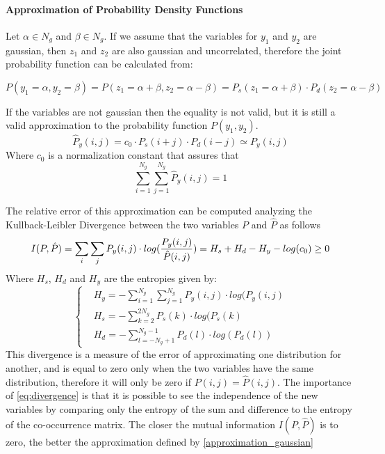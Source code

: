 \paragraph{Approximation of Probability Density Functions}
Let $\alpha \in N_g$ and $\beta \in N_g$.
If we assume that the variables for $y_1$ and $y_2$ are gaussian, then $z_1$ and $z_2$ are also gaussian and uncorrelated, therefore the joint probability function can be calculated from:

\begin{equation}
P(y_1=\alpha, y_2=\beta) = P(z_1=\alpha + \beta, z_2=\alpha - \beta) = P_s(z_1=\alpha+\beta)\cdot P_d(z_2=\alpha-\beta) 
\end{equation}

If the variables are not gaussian then the equality is not valid, but it is still a valid approximation to the probability function $P(y_1, y_2)$. 
\begin{equation}
    \hat{P}_y(i,j) = c_0\cdot P_s(i+j) \cdot P_d(i-j) \simeq P_y(i,j)
    \label{approximation_gaussian}
\end{equation}{}
Where $c_0$ is a normalization constant that assures that
\begin{equation}
    \sum_{i=1}^{N_g}\sum_{j=1}^{N_g} \hat{P}_y(i,j) = 1
\end{equation}{}

The relative error of this approximation can be computed analyzing the Kullback-Leibler Divergence between the two variables $P$ and $\hat{P}$ as follows
\begin{equation}
\label{eq:divergence}
    I(P, \hat{P}) = \sum_i\sum_j P_y(i,j)\cdot log(\frac{P_y(i,j)}{\hat{P}(i,j)}) = \\
    H_s + H_d - H_y -log(c_0)\geq0
\end{equation}{}
Where $H_s$, $H_d$ and $H_y$ are the entropies given by:
\begin{equation}
\begin{cases}
&H_y = -\sum_{i=1}^{N_g}\sum_{j=1}^{N_g}P_y(i,j)\cdot log(P_y(i,j)\\
&H_s = -\sum_{k=2}^{2N_g}P_s(k)\cdot log(P_s(k)\\
&H_d = -\sum_{l=-N_g+1}^{N_g-1}P_d(l)\cdot log(P_d(l))
\end{cases}
\end{equation}
This divergence is a measure of the error of approximating one distribution for another, and is equal to zero only when the two variables have the same distribution, therefore it will only be zero if $P(i,j)=\hat{P}(i,j)$. The importance of \ref{eq:divergence} is that it is possible to see the independence of the new variables by comparing only the entropy of the sum and difference to the entropy of the co-occurrence matrix. The closer the mutual information $I(P, \hat{P})$ is to zero, the better the approximation defined by \ref{approximation_gaussian}

